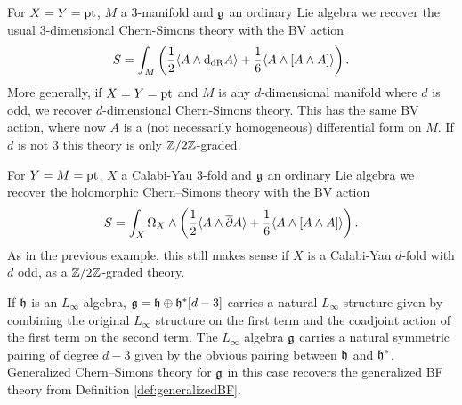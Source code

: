 \documentclass[10pt, oneside]{article}
\begin{document}
\begin{example}
For $X=Y=\operatorname{pt}$, $M$ a 3-manifold and $\mathfrak g$ an ordinary Lie algebra we recover the usual 3-dimensional Chern-Simons theory with the BV action
\[S = \int_M \left(\frac{1}{2}\langle A\wedge {\rm d}_{\mathrm{dR}} A\rangle + \frac{1}{6}\langle A\wedge [A\wedge A]\rangle\right).\]
More generally, if $X=Y=\operatorname{pt}$ and $M$ is any $d$-dimensional manifold where $d$ is odd, we recover $d$-dimensional Chern-Simons theory.  This has the same BV action, where now $A$ is a (not necessarily homogeneous) differential form on $M$.  If $d$ is not 3 this theory is only $\mathbb Z/2\mathbb Z$-graded.
\end{example}

\begin{example}
For $Y=M=\operatorname{pt}$, $X$ a Calabi-Yau 3-fold and $\mathfrak g$ an ordinary Lie algebra we recover the holomorphic Chern--Simons theory with the BV action
\[S = \int_X \Omega_X\wedge \left(\frac{1}{2}\langle A\wedge \overline{\partial} A\rangle + \frac{1}{6}\langle A\wedge [A\wedge A]\rangle\right).\]
As in the previous example, this still makes sense if $X$ is a Calabi-Yau $d$-fold with $d$ odd, as a $\mathbb Z/2\mathbb Z$-graded theory.
\end{example}

\begin{example}
If $\mathfrak h$ is an $L_\infty$ algebra, $\mathfrak g = \mathfrak h \oplus \mathfrak h^*[d-3]$ carries a natural $L_\infty$ structure given by combining the original $L_\infty$ structure on the first term and the coadjoint action of the first term on the second term. The $L_\infty$ algebra $\mathfrak g$ carries a natural symmetric pairing of degree $d-3$ given by the obvious pairing between $\mathfrak h$ and $\mathfrak h^*$. Generalized Chern--Simons theory for $\mathfrak g$ in this case recovers the generalized BF theory from Definition \ref{def:generalizedBF}.
\end{example}
\end{document}
